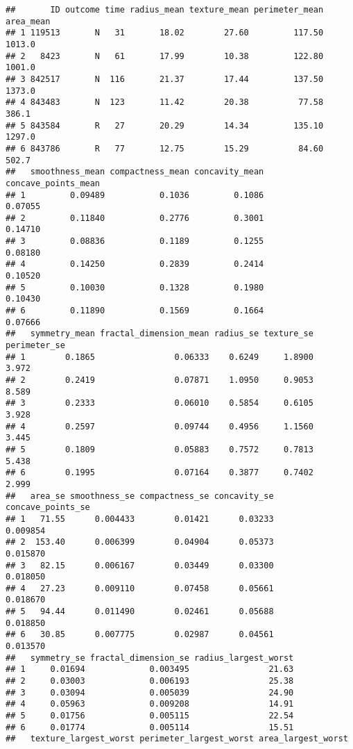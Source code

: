 \documentclass[]{article}
\begin{document}
\begin{verbatim}
##       ID outcome time radius_mean texture_mean perimeter_mean area_mean
## 1 119513       N   31       18.02        27.60         117.50    1013.0
## 2   8423       N   61       17.99        10.38         122.80    1001.0
## 3 842517       N  116       21.37        17.44         137.50    1373.0
## 4 843483       N  123       11.42        20.38          77.58     386.1
## 5 843584       R   27       20.29        14.34         135.10    1297.0
## 6 843786       R   77       12.75        15.29          84.60     502.7
##   smoothness_mean compactness_mean concavity_mean concave_points_mean
## 1         0.09489           0.1036         0.1086             0.07055
## 2         0.11840           0.2776         0.3001             0.14710
## 3         0.08836           0.1189         0.1255             0.08180
## 4         0.14250           0.2839         0.2414             0.10520
## 5         0.10030           0.1328         0.1980             0.10430
## 6         0.11890           0.1569         0.1664             0.07666
##   symmetry_mean fractal_dimension_mean radius_se texture_se perimeter_se
## 1        0.1865                0.06333    0.6249     1.8900        3.972
## 2        0.2419                0.07871    1.0950     0.9053        8.589
## 3        0.2333                0.06010    0.5854     0.6105        3.928
## 4        0.2597                0.09744    0.4956     1.1560        3.445
## 5        0.1809                0.05883    0.7572     0.7813        5.438
## 6        0.1995                0.07164    0.3877     0.7402        2.999
##   area_se smoothness_se compactness_se concavity_se concave_points_se
## 1   71.55      0.004433        0.01421      0.03233          0.009854
## 2  153.40      0.006399        0.04904      0.05373          0.015870
## 3   82.15      0.006167        0.03449      0.03300          0.018050
## 4   27.23      0.009110        0.07458      0.05661          0.018670
## 5   94.44      0.011490        0.02461      0.05688          0.018850
## 6   30.85      0.007775        0.02987      0.04561          0.013570
##   symmetry_se fractal_dimension_se radius_largest_worst
## 1     0.01694             0.003495                21.63
## 2     0.03003             0.006193                25.38
## 3     0.03094             0.005039                24.90
## 4     0.05963             0.009208                14.91
## 5     0.01756             0.005115                22.54
## 6     0.01774             0.005114                15.51
##   texture_largest_worst perimeter_largest_worst area_largest_worst

\end{verbatim}
\end{document}
